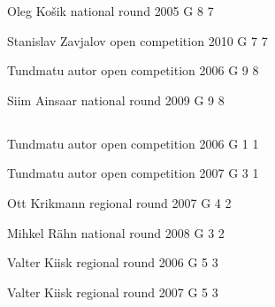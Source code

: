 \documentclass[11pt]{article}
\begin{document}
\ylDisplay{} %
{Oleg Košik} %
{national round} %
{2005} %
{G 8} %
{7} %
{

\ifEngStatement
\fi
}

\ylDisplay{} %
{Stanislav Zavjalov} %
{open competition} %
{2010} %
{G 7} %
{7} %
{

\ifEngStatement
\fi
}

\ylDisplay{} %
{Tundmatu autor} %
{open competition} %
{2006} %
{G 9} %
{8} %
{

\ifEngStatement
\fi
}

\ylDisplay{} %
{Siim Ainsaar} %
{national round} %
{2009} %
{G 9} %
{8} %
{

\ifEngStatement
\fi
}
\newpage\subsection{\protect{}}

\ylDisplay{} %
{Tundmatu autor} %
{open competition} %
{2006} %
{G 1} %
{1} %
{

\ifEngStatement
\fi
}

\ylDisplay{} %
{Tundmatu autor} %
{open competition} %
{2007} %
{G 3} %
{1} %
{

\ifEngStatement
\fi
}

\ylDisplay{} %
{Ott Krikmann} %
{regional round} %
{2007} %
{G 4} %
{2} %
{

\ifEngStatement
\fi
}

\ylDisplay{} %
{Mihkel Rähn} %
{national round} %
{2008} %
{G 3} %
{2} %
{

\ifEngStatement
\fi
}

\ylDisplay{} %
{Valter Kiisk} %
{regional round} %
{2006} %
{G 5} %
{3} %
{

\ifEngStatement
\fi
}

\ylDisplay{} %
{Valter Kiisk} %
{regional round} %
{2007} %
{G 5} %
{3} %
{

\ifEngStatement
\fi
}
\end{document}
